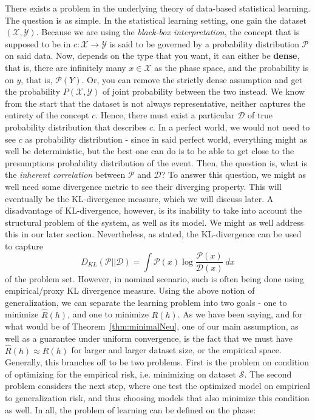 There exists a problem in the underlying theory of data-based statistical learning. The question is as simple. In the statistical learning setting, one gain the dataset $(\mathcal{X},\mathcal{Y})$. Because we are using the \textit{black-box interpretation}, the concept that is supposed to be in $c: \mathcal{X}\to \mathcal{Y}$ is said to be governed by a probability distribution $\mathcal{P}$ on said data. Now, depends on the type that you want, it can either be \textbf{dense}, that is, there are infinitely many $x\in \mathcal{X}$ as the phase space, and the probability is on $y$, that is, $\mathcal{P}(Y)$. Or, you can remove the strictly dense assumption and get the probability $P(\mathcal{X},\mathcal{Y})$ of joint probability between the two instead. We know from the start that the dataset is not always representative, neither captures the entirety of the concept $c$. Hence, there must exist a particular $\mathcal{D}$ of true probability distribution that describes $c$. In a perfect world, we would not need to see $c$ as probability distribution - since in said perfect world, everything might as well be deterministic, but the best one can do is to be able to get close to the presumptions probability distribution of the event. Then, the question is, what is the \textit{inherent correlation} between $\mathcal{P}$ and $\mathcal{D}$? To answer this question, we might as well need some divergence metric to see their diverging property. This will eventually be the $\mathrm{KL}$-divergence measure, which we will discuss later. A disadvantage of $\mathrm{KL}$-divergence, however, is its inability to take into account the structural problem of the system, as well as its model. We might as well address this in our later section. Nevertheless, as stated, the KL-divergence can be used to capture
\begin{equation}
    D_{KL}(\mathcal{P}||\mathcal{D}) = \int \mathcal{P}(x)\log{\frac{\mathcal{P}(x)}{\mathcal{D}(x)}}\:dx
\end{equation}
of the problem set. However, in nominal scenario, such is often being done using empirical/proxy KL divergence measure.
Using the above notion of generalization, we can separate the learning problem into two goals - one to minimize $\hat{R}(h)$, and one to minimize $R(h)$. As we have been saying, and for what would be of Theorem~\ref{thm:minimalNeu}, one of our main assumption, as well as a guarantee under uniform convergence, is the fact that we must have $\hat{R}(h)\approx R(h)$ for larger and larger dataset size, or the empirical space. Generally, this branches off to be two problems. First is the problem on condition of optimizing for the empirical risk, i.e. minimizing on dataset $\mathcal{S}$. The second problem considers the next step, where one test the optimized model on empirical to generalization risk, and thus choosing models that also minimize this condition as well. In all, the problem of learning can be defined on the phase:
